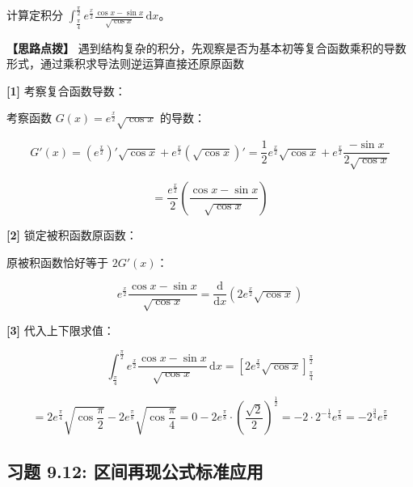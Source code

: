 \documentclass[11pt,a4paper,UTF8]{ctexart}
\begin{document}
计算定积分 $\int_{\frac{\pi}{4}}^{\frac{\pi}{2}} e^{\frac{x}{2}} \frac{\cos x - \sin x}{\sqrt{\cos x}}\,\mathrm{d}x$。

\textbf{\color{DeepPurple}【思路点拨】} 遇到结构复杂的积分，先观察是否为基本初等复合函数乘积的导数形式，通过乘积求导法则逆运算直接还原原函数


\begin{solbox}[分步推导与答题规范]
\textbf{[1]} 考察复合函数导数：

考察函数 $G(x) = e^{\frac{x}{2}}\sqrt{\cos x}$ 的导数：


\begin{equation*}
G'(x) = \left(e^{\frac{x}{2}}\right)'\sqrt{\cos x} + e^{\frac{x}{2}}(\sqrt{\cos x})' = \frac{1}{2}e^{\frac{x}{2}}\sqrt{\cos x} + e^{\frac{x}{2}}\frac{-\sin x}{2\sqrt{\cos x}}
\end{equation*}



\begin{equation*}
= \frac{e^{\frac{x}{2}}}{2}\left(\frac{\cos x - \sin x}{\sqrt{\cos x}}\right)
\end{equation*}


\textbf{[2]} 锁定被积函数原函数：

原被积函数恰好等于 $2 G'(x)$：


\begin{equation*}
e^{\frac{x}{2}} \frac{\cos x - \sin x}{\sqrt{\cos x}} = \frac{\mathrm{d}}{\mathrm{d}x}\left(2 e^{\frac{x}{2}}\sqrt{\cos x}\right)
\end{equation*}


\textbf{[3]} 代入上下限求值：


\begin{equation*}
\int_{\frac{\pi}{4}}^{\frac{\pi}{2}} e^{\frac{x}{2}} \frac{\cos x - \sin x}{\sqrt{\cos x}}\,\mathrm{d}x = \left[ 2 e^{\frac{x}{2}}\sqrt{\cos x} \right]_{\frac{\pi}{4}}^{\frac{\pi}{2}}
\end{equation*}



\begin{equation*}
= 2 e^{\frac{\pi}{4}}\sqrt{\cos\frac{\pi}{2}} - 2 e^{\frac{\pi}{8}}\sqrt{\cos\frac{\pi}{4}} = 0 - 2 e^{\frac{\pi}{8}} \cdot \left(\frac{\sqrt{2}}{2}\right)^{\frac{1}{2}} = -2 \cdot 2^{-\frac{1}{4}} e^{\frac{\pi}{8}} = -2^{\frac{3}{4}}e^{\frac{\pi}{8}}
\end{equation*}

\end{solbox}


\subsection{习题 9.12: 区间再现公式标准应用}
\end{document}
